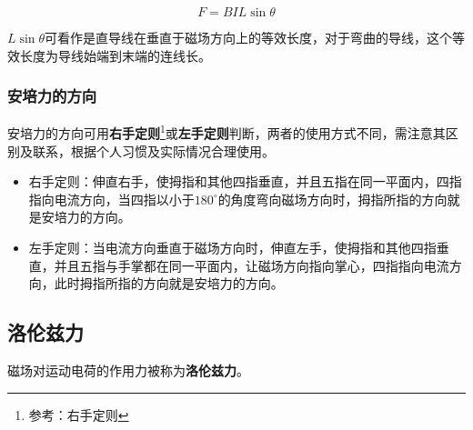 \begin{equation}
F=BIL\sin\theta
\end{equation}

$ L\sin\theta$可看作是直导线在垂直于磁场方向上的等效长度，对于弯曲的导线，这个等效长度为导线始端到末端的连线长。

\subsubsection{安培力的方向}

安培力的方向可用\textbf{右手定则}\footnote{参考：右手定则}或\textbf{左手定则}判断，两者的使用方式不同，需注意其区别及联系，根据个人习惯及实际情况合理使用。

\begin{itemize}
\item 右手定则：伸直右手，使拇指和其他四指垂直，并且五指在同一平面内，四指指向电流方向，当四指以小于$180^\circ$的角度弯向磁场方向时，拇指所指的方向就是安培力的方向。
\item 左手定则：当电流方向垂直于磁场方向时，伸直左手，使拇指和其他四指垂直，并且五指与手掌都在同一平面内，让磁场方向指向掌心，四指指向电流方向，此时拇指所指的方向就是安培力的方向。
\end{itemize}

\subsection{洛伦兹力}

磁场对运动电荷的作用力被称为\textbf{洛伦兹力}。